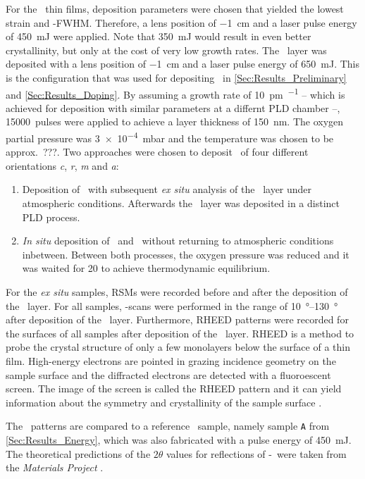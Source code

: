 For the \cro\ thin films, deposition parameters were chosen that yielded the lowest strain and \textomega-FWHM.
Therefore, a lens position of \qty{-1}{\cm} and a laser pulse energy of \qty{450}{\milli\joule} were applied.
Note that \qty{350}{\milli\joule} would result in even better crystallinity, but only at the cost of very low growth rates.
The \gao\ layer was deposited with a lens position of \qty{-1}{\cm} and a laser pulse energy of \qty{650}{\milli\joule}.
This is the configuration that was used for depositing \cro\ in \ref{Sec:Results_Preliminary} and \ref{Sec:Results_Doping}.
By assuming a growth rate of \qty{10}{\pm\per\pulse} -- which is achieved for deposition with similar parameters at a differnt PLD chamber --, \qty{15000}{pulses} were applied to achieve a layer thickness of \qty{150}{\nm}.
The oxygen partial pressure was \qty{3e-4}{\milli\bar} and the temperature was chosen to be approx.\ ???.
Two approaches were chosen to deposit \agao\ of four different orientations \textit{c}, \textit{r}, \textit{m} and \textit{a}:
\begin{enumerate}
    \item Deposition of \cro\ with subsequent \textit{ex situ} analysis of the \cro\ layer under atmospheric conditions.
    Afterwards the \gao\ layer was deposited in a distinct PLD process.
    \item \textit{In situ} deposition of \cro\ and \gao\ without returning to atmospheric conditions inbetween.
    Between both processes, the oxygen pressure was reduced and it was waited for \qty{20}{\min} to achieve thermodynamic equilibrium.
\end{enumerate}

For the \textit{ex situ} samples, \glspl{RSM} were recorded before and after the deposition of the \gao\ layer.
For all samples, \thetaomega-scans were performed in the range of \qtyrange{10}{130}{\degree} after deposition of the \gao\ layer.
Furthermore, \gls{RHEED} patterns were recorded for the surfaces of all samples after deposition of the \gao\ layer.
    \gls{RHEED} is a method to probe the crystal structure of only a few monolayers below the surface of a thin film.
    High-energy electrons are pointed in grazing incidence geometry on the sample surface and the diffracted electrons are detected with a fluoroescent screen.
    The image of the screen is called the RHEED pattern and it can yield information about the symmetry and crystallinity of the sample surface
        \cite{hafez2022}.

The \thetaomega\ patterns are compared to a reference \cro\ sample, namely sample \texttt{A} from \ref{Sec:Results_Energy}, which was also fabricated with a pulse energy of \qty{450}{\milli\joule}.
The theoretical predictions of the $2\theta$ values for reflections of \textbeta-\gao\ were taken from the \textit{Materials Project}
    \cite[mp-886]{MaterialsProject}.
